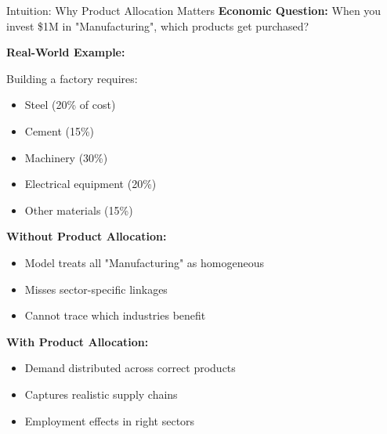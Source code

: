 \documentclass[10pt]{beamer}
\begin{document}
\begin{frame}{Intuition: Why Product Allocation Matters}
\textbf{Economic Question:} When you invest \$1M in "Manufacturing", which products get purchased?

\vspace{0.3cm}

\textbf{Real-World Example:}

Building a factory requires:
\begin{itemize}
    \item Steel (20\% of cost)
    \item Cement (15\%)
    \item Machinery (30\%)
    \item Electrical equipment (20\%)
    \item Other materials (15\%)
\end{itemize}

\vspace{0.3cm}

\textbf{Without Product Allocation:}
\begin{itemize}
    \item[\textcolor{red}{✗}] Model treats all "Manufacturing" as homogeneous
    \item[\textcolor{red}{✗}] Misses sector-specific linkages
    \item[\textcolor{red}{✗}] Cannot trace which industries benefit
\end{itemize}

\vspace{0.3cm}

\textbf{With Product Allocation:}
\begin{itemize}
    \item[\textcolor{blue}{✓}] Demand distributed across correct products
    \item[\textcolor{blue}{✓}] Captures realistic supply chains
    \item[\textcolor{blue}{✓}] Employment effects in right sectors
\end{itemize}

\end{frame}

\end{document}
